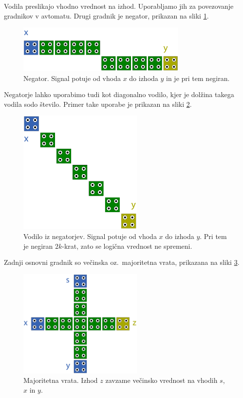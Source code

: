\documentclass[a4paper, 11pt]{article}
\begin{document}
Vodila preslikajo vhodno vrednost na izhod.
Uporabljamo jih za povezovanje gradnikov v avtomatu.
Drugi gradnik je negator, prikazan na sliki \ref{img-pregled-negator}.

\begin{figure}[h]
	\centering
	\includegraphics[width=0.75\textwidth]{../img/pregled/negator.pdf}
	\caption{Negator. Signal potuje od vhoda $x$ do izhoda $y$ in je pri tem negiran.}
	\label{img-pregled-negator}
\end{figure}

Negatorje lahko uporabimo tudi kot diagonalno vodilo, kjer je dolžina takega vodila sodo število.
Primer take uporabe je prikazan na sliki \ref{img-pregled-negbus}.

\begin{figure}[h]
	\centering
	\includegraphics[width=0.55\textwidth]{../img/pregled/negbus.pdf}
	\caption{Vodilo iz negatorjev. Signal potuje od vhoda $x$ do izhoda $y$. Pri tem je negiran $2k$-krat, zato se logična vrednost ne spremeni.}
	\label{img-pregled-negbus}
\end{figure}

Zadnji osnovni gradnik so večinska oz.~majoritetna vrata, prikazana na sliki \ref{img-pregled-major}.

\begin{figure}[h]
	\centering
	\includegraphics[width=0.55\textwidth]{../img/pregled/major.pdf}
	\caption{Majoritetna vrata. Izhod $z$ zavzame večinsko vrednost na vhodih $s$, $x$ in $y$.}
	\label{img-pregled-major}
\end{figure}
\end{document}

